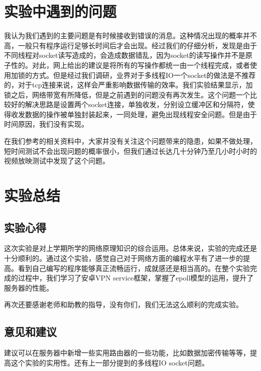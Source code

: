 \documentclass[paper=a4, fontsize=11pt, UTF8]{article} %
\begin{document}
\section{实验中遇到的问题}
我认为我们遇到的主要问题是有时候接收到错误的消息。这种情况出现的概率并不高，一般只有程序运行足够长时间后才会出现。经过我们的仔细分析，发现是由于不同线程对socket读写造成的，会造成数据错乱，因为socket的读写操作并不是原子性的。对此，网上给出的建议是将所有的写操作都统一由一个线程完成，或者使用加锁的方式。但是经过我们调研，业界对于多线程IO一个socket的做法是不推荐的，对于tcp连接来说，这样会严重影响数据传输的效率。我们实验结果显示，加锁之后，网络带宽有所降低，但是之前遇到的问题没有再次发生。这个问题一个比较好的解决思路是设置两个socket连接，单独收发，分别设立缓冲区和分隔符，使得收发数据的操作被单独封装起来，一同处理，避免出现线程安全问题。但是由于时间原因，我们没有实现。

在我们参考的相关资料中，大家并没有关注这个问题带来的隐患，如果不做处理，短时间测试不会出现问题的概率很小，但我们通过长达几十分钟乃至几小时小时的视频放映测试中发现了这个问题。

\section{实验总结}
\subsection{实验心得}
这次实验是对上学期所学的网络原理知识的综合运用。总体来说，实验的完成还是十分顺利的。通过这个实验，感觉自己对于网络方面的编程水平有了进一步的提高。看到自己编写的程序能够真正流畅运行，成就感还是相当高的。在整个实验完成的过程中，我们学习了安卓VPN service框架，掌握了epoll模型的运用，提升了服务器的性能。

再次还要感谢老师和助教的指导，没有你们，我们无法这么顺利的完成实验。

\subsection{意见和建议}
建议可以在服务器中新增一些实用路由器的一些功能，比如数据加密传输等等，提高这个实验的实用性。还有上一部分提到的多线程IO socket问题。
\end{document}
